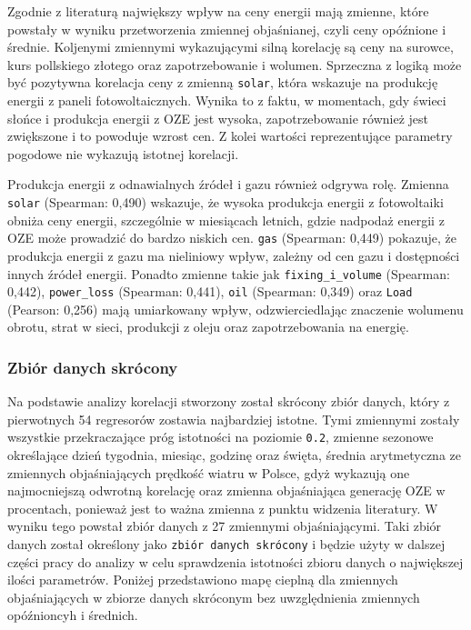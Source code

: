 Zgodnie z literaturą największy wpływ na ceny energii mają zmienne, które powstały w wyniku przetworzenia zmiennej objaśnianej, czyli ceny opóźnione i średnie. Koljenymi zmiennymi wykazującymi silną korelację są ceny na surowce, kurs pollskiego złotego oraz zapotrzebowanie i wolumen. Sprzeczna z logiką może być pozytywna korelacja ceny z zmienną \texttt{solar}, która wskazuje na produkcję energii z paneli fotowoltaicznych. Wynika to z faktu, w momentach, gdy świeci słońce i produkcja energii z OZE jest wysoka, zapotrzebowanie również jest zwiększone i to powoduje wzrost cen. Z kolei wartości reprezentujące parametry pogodowe nie wykazują istotnej korelacji. 

Produkcja energii z odnawialnych źródeł i gazu również odgrywa rolę. Zmienna \texttt{solar} (Spearman: 0,490) wskazuje, że wysoka produkcja energii z fotowoltaiki obniża ceny energii, szczególnie w miesiącach letnich, gdzie nadpodaż energii z OZE może prowadzić do bardzo niskich cen. \texttt{gas} (Spearman: 0,449) pokazuje, że produkcja energii z gazu ma nieliniowy wpływ, zależny od cen gazu i dostępności innych źródeł energii. Ponadto zmienne takie jak \texttt{fixing\_i\_volume} (Spearman: 0,442), \texttt{power\_loss} (Spearman: 0,441), \texttt{oil} (Spearman: 0,349) oraz \texttt{Load} (Pearson: 0,256) mają umiarkowany wpływ, odzwierciedlając znaczenie wolumenu obrotu, strat w sieci, produkcji z oleju oraz zapotrzebowania na energię.

\subsubsection{Zbiór danych skrócony}
Na podstawie analizy korelacji stworzony został skrócony zbiór danych, który z pierwotnych 54 regresorów zostawia najbardziej istotne. Tymi zmiennymi zostały wszystkie przekraczające próg istotności na poziomie \texttt{0.2},  zmienne sezonowe określające dzień tygodnia, miesiąc, godzinę oraz święta, średnia arytmetyczna ze zmiennych objaśniających prędkość wiatru w Polsce, gdyż wykazują one najmocniejszą odwrotną korelację oraz zmienna objaśniająca generację OZE w procentach, ponieważ jest to ważna zmienna z punktu widzenia literatury. W wyniku tego powstał zbiór danych z 27 zmiennymi objaśniającymi. Taki zbiór danych został określony jako \texttt{zbiór danych skrócony} i będzie użyty w dalszej części pracy do analizy w celu sprawdzenia istotności zbioru danych o największej ilości parametrów. Poniżej przedstawiono mapę cieplną dla zmiennych objaśniających w zbiorze danych skróconym bez uwzględnienia zmiennych opóźnioncyh i średnich. 

